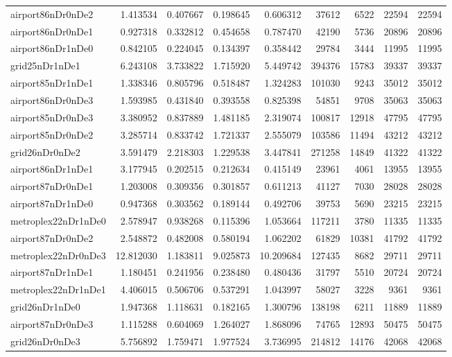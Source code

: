 \begin{longtable}{|l|r|r|r|r|r|r|r|r|}
airport86nDr0nDe2 & 1.413534 & 0.407667 & 0.198645 & 0.606312 & 37612 & 6522 & 22594 & 22594 \\
airport86nDr0nDe1 & 0.927318 & 0.332812 & 0.454658 & 0.787470 & 42190 & 5736 & 20896 & 20896 \\
airport86nDr1nDe0 & 0.842105 & 0.224045 & 0.134397 & 0.358442 & 29784 & 3444 & 11995 & 11995 \\
grid25nDr1nDe1 & 6.243108 & 3.733822 & 1.715920 & 5.449742 & 394376 & 15783 & 39337 & 39337 \\
airport85nDr1nDe1 & 1.338346 & 0.805796 & 0.518487 & 1.324283 & 101030 & 9243 & 35012 & 35012 \\
airport86nDr0nDe3 & 1.593985 & 0.431840 & 0.393558 & 0.825398 & 54851 & 9708 & 35063 & 35063 \\
airport85nDr0nDe3 & 3.380952 & 0.837889 & 1.481185 & 2.319074 & 100817 & 12918 & 47795 & 47795 \\
airport85nDr0nDe2 & 3.285714 & 0.833742 & 1.721337 & 2.555079 & 103586 & 11494 & 43212 & 43212 \\
grid26nDr0nDe2 & 3.591479 & 2.218303 & 1.229538 & 3.447841 & 271258 & 14849 & 41322 & 41322 \\
airport86nDr1nDe1 & 3.177945 & 0.202515 & 0.212634 & 0.415149 & 23961 & 4061 & 13955 & 13955 \\
airport87nDr0nDe1 & 1.203008 & 0.309356 & 0.301857 & 0.611213 & 41127 & 7030 & 28028 & 28028 \\
airport87nDr1nDe0 & 0.947368 & 0.303562 & 0.189144 & 0.492706 & 39753 & 5690 & 23215 & 23215 \\
metroplex22nDr1nDe0 & 2.578947 & 0.938268 & 0.115396 & 1.053664 & 117211 & 3780 & 11335 & 11335 \\
airport87nDr0nDe2 & 2.548872 & 0.482008 & 0.580194 & 1.062202 & 61829 & 10381 & 41792 & 41792 \\
metroplex22nDr0nDe3 & 12.812030 & 1.183811 & 9.025873 & 10.209684 & 127435 & 8682 & 29711 & 29711 \\
airport87nDr1nDe1 & 1.180451 & 0.241956 & 0.238480 & 0.480436 & 31797 & 5510 & 20724 & 20724 \\
metroplex22nDr1nDe1 & 4.406015 & 0.506706 & 0.537291 & 1.043997 & 58027 & 3228 & 9361 & 9361 \\
grid26nDr1nDe0 & 1.947368 & 1.118631 & 0.182165 & 1.300796 & 138198 & 6211 & 11889 & 11889 \\
airport87nDr0nDe3 & 1.115288 & 0.604069 & 1.264027 & 1.868096 & 74765 & 12893 & 50475 & 50475 \\
grid26nDr0nDe3 & 5.756892 & 1.759471 & 1.977524 & 3.736995 & 214812 & 14176 & 42068 & 42068 \\

\end{longtable}
